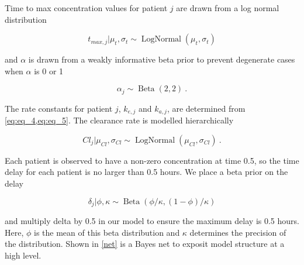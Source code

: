 Time to max concentration values for patient $j$ are drawn from a log normal distribution

\begin{equation}\label{eq:eq_6}
t_{\mathit{max}, j} \vert \mu_t, \sigma_t \sim \operatorname{LogNormal}(\mu_t, \sigma_t)
\end{equation}

\noindent and $\alpha$ is drawn from a weakly informative beta prior to prevent degenerate cases when $\alpha$  is 0 or 1

\begin{equation}\label{eq:eq_7}
\alpha_j \sim \operatorname{Beta}(2,2)  \>.
\end{equation}

\noindent The rate constants for patient $j$,  $k_{e,j}$ and $k_{a,j}$, are determined from \cref{eq:eq_4,eq:eq_5}. The clearance rate is modelled hierarchically

\begin{equation}\label{eq:eq_8}
\mathit{Cl}_j \vert \mu_{\mathit{Cl}}, \sigma_{\mathit{Cl}}  \sim \operatorname{LogNormal}(\mu_{\mathit{Cl}}, \sigma_{\mathit{Cl}}) \>.
\end{equation}

\noindent Each patient is observed to have a non-zero concentration at time 0.5, so the time delay for each patient is no larger than 0.5 hours.  We place a beta prior on the delay

\begin{equation}\label{eq:eq_9}
\delta_j \vert \phi, \kappa \sim \operatorname{Beta}(\phi / \kappa, (1-\phi) / \kappa)
\end{equation}

\noindent and multiply delta by 0.5 in our model to ensure the maximum delay is 0.5 hours.  Here, $\phi$ is the mean of this beta distribution and $\kappa$ determines the precision of the distribution. Shown in \cref{net} is a Bayes net to exposit model structure at a high level.

